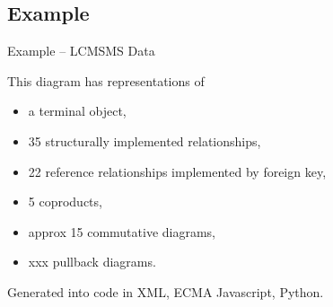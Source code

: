 \subsection{Example}
\begin{frame}{Example -- LCMSMS Data}
\scalebox{0.2}{

}
\pause
\vspace{-5cm}
\begin{block}{}
This diagram has representations of
\begin{itemize}
  \item a terminal object,
  \item 35 structurally implemented relationships, 
  \item 22 reference relationships implemented by foreign key,
  \item 5 coproducts,
  \item approx 15 commutative diagrams,
  \item xxx pullback diagrams.
\end{itemize}
Generated into code in XML, ECMA Javascript, Python.
\end{block}
\end{frame}
\fi

\iffalse
\begin{frame}{Nested data structures}
draw single nested relational data model
less columns now and that is because some structure is represented niot by foreign keys but by the nesting of struture. Thats why this example is representative of how data about departments, professors and students might be represented in other messaging systems such as XML ad IDL and also in hierarchical databases. 

decisions about how which data relationships to represent by nesting are recorded by distinguishing certain morphisms of the sketch as being represented `structurally'
(in IDL for eaxample the keyword would be struct).

These distinguished morphisms determine (have you guessed this yet) a contextual category 
\end{frame}


\begin{frame}{Missing Data and Range Categories}
\end{frame}

\begin{frame}{The problem caused by absence.}
\begin{itemize}
\item relational schemas (SQL) can be generated from this diagram. So to data structure definitions in programming language and in messaging technologies such as XML and IDL. 
\item the commutivity of the diagrams, $s \circ d2 = d_1$ and $h circ d2 =id$, is reflected in the relational structure and the other representations such as in XML and IDL.  
\item that the triangles commutes has an effect on the relational structure but equally on xml or idl or other such message structures. 
\end{itemize}
\end{frame}
\fi


